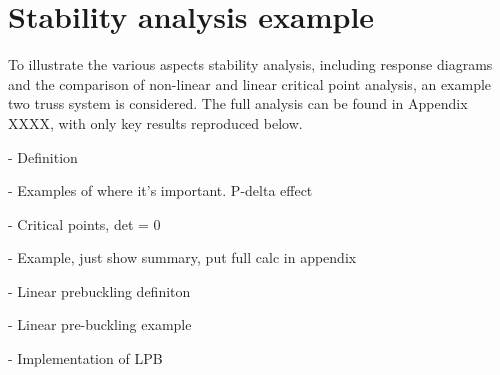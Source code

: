 \section{Stability analysis example}

To illustrate the various aspects stability analysis, including response diagrams and the comparison of non-linear and linear critical point analysis, an example two truss system is considered. The full analysis can be found in Appendix XXXX, with only key results reproduced below.






- Definition

- Examples of where it's important. P-delta effect

- Critical points, det = 0

- Example, just show summary, put full calc in appendix

- Linear prebuckling definiton

- Linear pre-buckling example

- Implementation of LPB